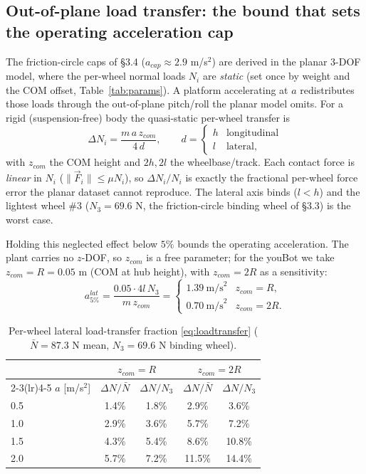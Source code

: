 \documentclass[11pt]{article}
\begin{document}
\subsection{Out-of-plane load transfer: the bound that sets the operating
acceleration cap}
The friction-circle caps of \S3.4 ($a_{cap}\approx2.9$ m/s$^2$) are derived in the
planar 3-DOF model, where the per-wheel normal loads $N_i$ are \emph{static} (set
once by weight and the COM offset, Table~\ref{tab:params}). A platform
accelerating at $a$ redistributes those loads through the out-of-plane pitch/roll
the planar model omits. For a rigid (suspension-free) body the quasi-static
per-wheel transfer is
\begin{equation}
\Delta N_i=\frac{m\,a\,z_{com}}{4\,d},\qquad
d=\begin{cases}h&\text{longitudinal}\\ l&\text{lateral,}\end{cases}
\label{eq:loadtransfer}
\end{equation}
with $z_{com}$ the COM height and $2h,2l$ the wheelbase/track. Each contact force
is \emph{linear} in $N_i$ ($\|\vec F_i\|\le\mu N_i$), so $\Delta N_i/N_i$ is
exactly the fractional per-wheel force error the planar dataset cannot reproduce.
The lateral axis binds ($l<h$) and the lightest wheel \#3 ($N_3=69.6$ N, the
friction-circle binding wheel of \S3.3) is the worst case.

Holding this neglected effect below $5\%$ bounds the operating acceleration. The
plant carries no $z$-DOF, so $z_{com}$ is a free parameter; for the youBot we take
$z_{com}=R=0.05$ m (COM at hub height), with $z_{com}=2R$ as a sensitivity:
\begin{equation}
a_{5\%}^{lat}=\frac{0.05\cdot4l\,N_3}{m\,z_{com}}=
\begin{cases}1.39\ \text{m/s}^2 & z_{com}=R,\\[2pt]
0.70\ \text{m/s}^2 & z_{com}=2R.\end{cases}
\end{equation}
\begin{table}[h]\centering\small
\begin{tabular}{lcccc}
\toprule
& \multicolumn{2}{c}{$z_{com}=R$} & \multicolumn{2}{c}{$z_{com}=2R$}\\
\cmidrule(lr){2-3}\cmidrule(lr){4-5}
$a$ [m/s$^2$] & $\Delta N/\bar N$ & $\Delta N/N_3$ & $\Delta N/\bar N$ & $\Delta N/N_3$\\
\midrule
0.5 & 1.4\% & 1.8\% & 2.9\% & 3.6\%\\
1.0 & 2.9\% & 3.6\% & 5.7\% & 7.2\%\\
1.5 & 4.3\% & 5.4\% & 8.6\% & 10.8\%\\
2.0 & 5.7\% & 7.2\% & 11.5\% & 14.4\%\\
\bottomrule
\end{tabular}
\caption{Per-wheel lateral load-transfer fraction \eqref{eq:loadtransfer}
($\bar N=87.3$ N mean, $N_3=69.6$ N binding wheel).}
\label{tab:loadtransfer}
\end{table}
\end{document}
